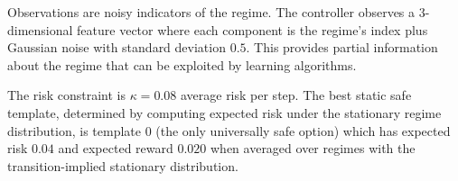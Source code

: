 \documentclass[sigconf,anonymous]{acmart}
\begin{document}
Observations are noisy indicators of the regime. The controller observes a $3$-dimensional feature vector where each component is the regime's index plus Gaussian noise with standard deviation $0.5$. This provides partial information about the regime that can be exploited by learning algorithms.

The risk constraint is $\kappa = 0.08$ average risk per step. The best static safe template, determined by computing expected risk under the stationary regime distribution, is template $0$ (the only universally safe option) which has expected risk $0.04$ and expected reward $0.020$ when averaged over regimes with the transition-implied stationary distribution.
\end{document}
